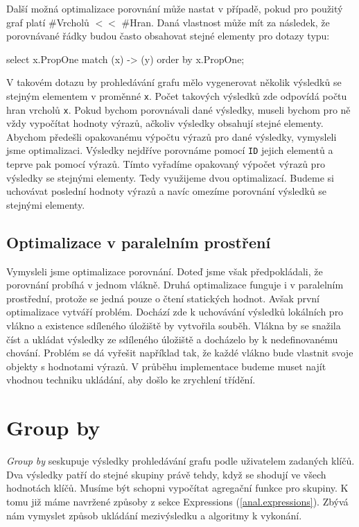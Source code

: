 Další možná optimalizace porovnání může nastat v případě, pokud pro použitý graf platí \#Vrcholů $<<$ \#Hran.
Daná vlastnost může mít za následek, že porovnávané řádky budou často obsahovat stejné elementy pro dotazy typu:
\begin{code}
select x.PropOne match (x) -> (y) order by x.PropOne;
\end{code}
V takovém dotazu by prohledávání grafu mělo vygenerovat několik výsledků se stejným elementem v proměnné \texttt{x}.
Počet takových výsledků zde odpovídá počtu hran vrcholů \texttt{x}.
Pokud bychom porovnávali dané výsledky, museli bychom pro ně vždy vypočítat hodnoty výrazů, ačkoliv výsledky obsahují stejné elementy.
Abychom předešli opakovanému výpočtu výrazů pro dané výsledky, vymysleli jsme optimalizaci.
Výsledky nejdříve porovnáme pomocí \texttt{ID} jejich elementů a teprve pak pomocí výrazů.
Tímto vyřadíme opakovaný výpočet výrazů pro výsledky se stejnými elementy.
Tedy využijeme dvou optimalizací.
Budeme si uchovávat poslední hodnoty výrazů a navíc omezíme porovnání výsledků se stejnými elementy.

\subsection{Optimalizace v paralelním prostření}

Vymysleli jsme optimalizace porovnání.
Doteď jsme však předpokládali, že porovnání probíhá v jednom vlákně.
Druhá optimalizace funguje i v paralelním prostřední, protože se jedná pouze o čtení statických hodnot.
Avšak první optimalizace vytváří problém.
Dochází zde k uchovávání výsledků lokálních pro vlákno a existence sdíleného úložiště by vytvořila souběh.
Vlákna by se snažila číst a ukládat výsledky ze sdíleného úložiště a docházelo by k nedefinovanému chování.
Problém se dá vyřešit například tak, že každé vlákno bude vlastnit svoje objekty s hodnotami výrazů.
V průběhu implementace budeme muset najít vhodnou techniku ukládání, aby došlo ke zrychlení třídění.

\section{Group by} \label{anal.groupby}

\textit{Group by} seskupuje výsledky prohledávání grafu podle uživatelem zadaných klíčů.
Dva výsledky patří do stejné skupiny právě tehdy, když se shodují ve všech hodnotách klíčů.
Musíme být schopni vypočítat agregační funkce pro skupiny.
K tomu již máme navržené způsoby z sekce Expressions (\ref{anal.expressions}).
Zbývá nám vymyslet způsob ukládání mezivýsledku a algoritmy k vykonání.

